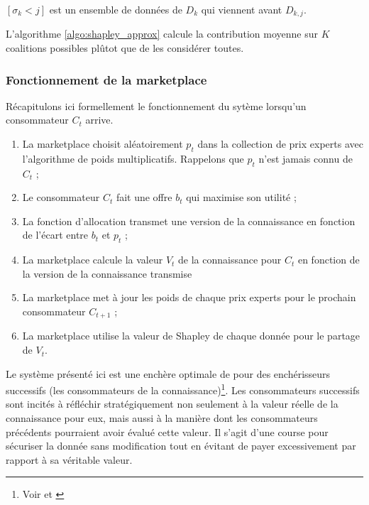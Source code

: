 $[\sigma_k < j]$ est un ensemble de données de $D_k$ qui viennent avant $D_{k,j}$.

L'algorithme \ref{algo:shapley_approx} calcule la contribution moyenne sur $K$ coalitions possibles plûtot que de les considérer toutes.

\subsubsection{Fonctionnement de la marketplace} \label{subsubsec:fonctionnement de la marketplace}
Récapitulons ici formellement le fonctionnement du sytème lorsqu'un consommateur $C_t$ arrive.


\begin{enumerate}
    \item La marketplace choisit aléatoirement $p_t$ dans la collection de prix experts avec l'algorithme de poids multiplicatifs. Rappelons que $p_t$ n'est jamais connu de $C_t$ ;
    \item Le consommateur $C_t$  fait une offre $b_t$ qui maximise son utilité ;
    \item La fonction d'allocation transmet une version de la connaissance en fonction de l'écart entre $b_t$ et $p_t$ ;
    \item La marketplace calcule la valeur $V_t$ de la connaissance pour $C_t$ en fonction de la version de la connaissance transmise\\
    \item La marketplace met à jour les poids de chaque prix experts pour le prochain consommateur $C_{t+1}$ ;
    \item La marketplace utilise la valeur de Shapley de chaque donnée pour le partage de $V_t$.
\end{enumerate}


Le système présenté ici est une enchère optimale de \citeauthor{myerson_optimal_1981} pour des enchérisseurs successifs (les consommateurs de la connaissance)\footnote{Voir \cite{myerson_optimal_1981} et \cite{noauthor_myersons_nodate}}. Les consommateurs successifs sont incités à réfléchir stratégiquement non seulement à la valeur réelle de la connaissance pour eux, mais aussi à la manière dont les consommateurs précédents pourraient avoir évalué cette valeur. Il s'agit d'une course pour sécuriser la donnée sans modification tout en évitant de payer excessivement par rapport à sa véritable valeur.

